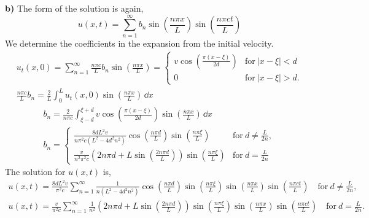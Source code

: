 {\begin{Solution}
  \textbf{b)}
  The form of the solution is again,
  \[
  u(x, t) = \sum_{n=1}^\infty b_n \sin\left( \frac{n \pi x}{L} \right) 
  \sin\left( \frac{n \pi c t}{L} \right)
  \]
  We determine the coefficients in the expansion from the initial velocity.
  \begin{gather*}
    u_t(x, 0) = \sum_{n=1}^\infty \frac{n \pi c}{L} b_n \sin\left( \frac{n \pi x}{L}\right)
    = \begin{cases}
      v \cos\left( \frac{\pi(x-\xi)}{2d} \right) &\mathrm{for}\ |x-\xi| < d \\
      0 &\mathrm{for}\ |x-\xi| > d.
    \end{cases} \\
    \frac{n \pi c}{L} b_n = \frac{2}{L} \int_0^L u_t(x, 0) 
    \sin\left( \frac{n \pi x}{L} \right) \,\dd x
  \end{gather*}
  \begin{gather*}
    b_n = \frac{2}{n \pi c} \int_{\xi-d}^{\xi+d} v 
    \cos\left( \frac{\pi(x-\xi)}{2d} \right)
    \sin\left( \frac{n \pi x}{L} \right) \,\dd x \\
    b_n = \begin{cases}
      \frac{8 d L^2 v}{n \pi^2 c (L^2 - 4 d^2 n^2)}
      \cos\left( \frac{n \pi d}{L} \right)
      \sin\left( \frac{n \pi \xi}{L} \right)
      &\mathrm{for}\ d \neq \frac{L}{2 n}, \\
      \frac{v}{n^2 \pi^2 c} \left( 2 n \pi d + L \sin\left( \frac{2 n \pi d}{L} 
        \right) \right) \sin\left( \frac{n \pi \xi}{L} \right)
      &\mathrm{for}\ d = \frac{L}{2 n}
    \end{cases}
  \end{gather*}
  The solution for $u(x, t)$ is,
  \begin{gather*}
    \boxed{
      u(x, t) = \frac{8 d L^2 v}{\pi^2 c} \sum_{n=1}^\infty \frac{1}{n (L^2 - 4 d^2 n^2)} 
      \cos\left( \frac{n \pi d}{L} \right)
      \sin\left( \frac{n \pi \xi}{L} \right)
      \sin\left( \frac{n \pi x}{L} \right)
      \sin\left( \frac{n \pi c t}{L} \right) 
      \quad \mathrm{for}\ d \neq \frac{L}{2 n},
      } \\
    \boxed{
      u(x, t) = \frac{v}{\pi^2 c} \sum_{n=1}^\infty \frac{1}{n^2}
      \left( 2 n \pi d + L \sin\left( \frac{2 n \pi d}{L} \right) \right)
      \sin\left( \frac{n \pi \xi}{L} \right)
      \sin\left( \frac{n \pi x}{L} \right)
      \sin\left( \frac{n \pi c t}{L} \right) 
      \quad \mathrm{for}\ d = \frac{L}{2 n}.
      }
  \end{gather*}


\end{Solution}}
